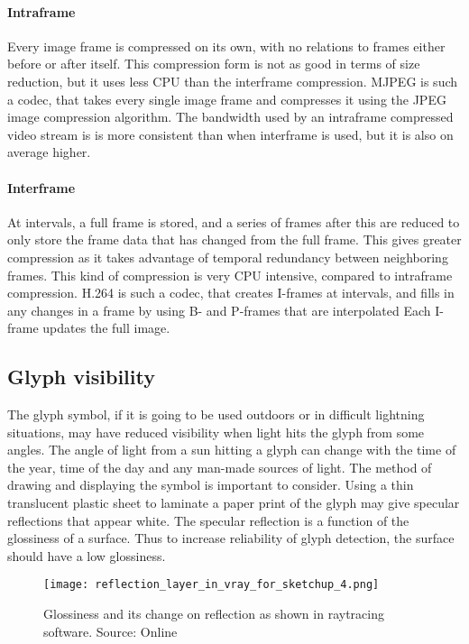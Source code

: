 \paragraph{Intraframe}
Every image frame is compressed on its own, with no relations to frames either before or after itself. This compression form is not as good in terms of size reduction, but it uses less CPU than the interframe compression. MJPEG is such a codec, that takes every single image frame and compresses it using the JPEG image compression algorithm. The bandwidth used by an intraframe compressed video stream is is more consistent than when interframe is used, but it is also on average higher.

\paragraph{Interframe}
At intervals, a full frame is stored, and a series of frames after this are reduced to only store the frame data that has changed from the full frame. This gives greater compression as it takes advantage of temporal redundancy between neighboring frames. This kind of compression is very CPU intensive, compared to intraframe compression. H.264 is such a codec, that creates I-frames at intervals, and fills in any changes in a frame by using B- and P-frames that are interpolated Each I-frame updates the full image.

\subsection{Glyph visibility}
The glyph symbol, if it is going to be used outdoors or in difficult lightning situations, may have reduced visibility when light hits the glyph from some angles. The angle of light from a sun hitting a glyph can change with the time of the year, time of the day and any man-made sources of light. The method of drawing and displaying the symbol is important to consider.
Using a thin translucent plastic sheet to laminate a paper print of the glyph may give specular reflections that appear white. The specular reflection is a function of the glossiness of a surface. Thus to increase reliability of glyph detection, the surface should have a low glossiness.

\begin{figure}[ht]
    \centering
    \texttt{[image: reflection\_layer\_in\_vray\_for\_sketchup\_4.png]}
    \caption{Glossiness and its change on reflection as shown in raytracing software. Source: Online \citet{gloss15}}
    \label{fig:reflection_layer_in_vray_for_sketchup_4}
\end{figure}
\FloatBarrier

